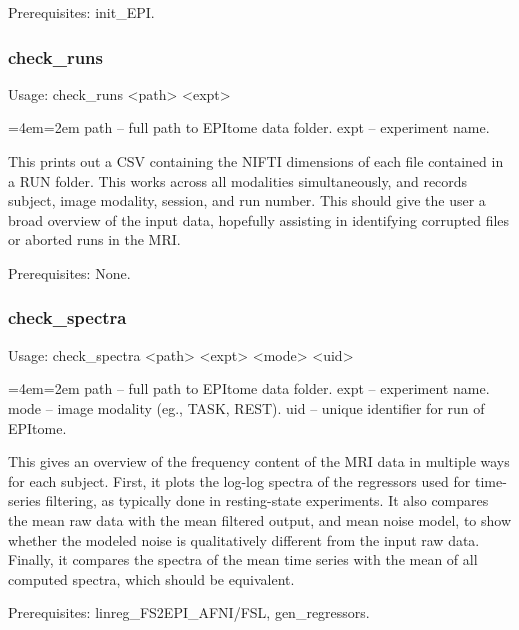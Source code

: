 \documentclass[final,titlepage,letterpaper,oneside,12pt]{article}
\renewcommand{\texttt}[2][BrickRed]{\textcolor{#1}{\ttfamily #2}}%
\newenvironment{blockquote}{%
  \par%
  \medskip
  \leftskip=4em\rightskip=2em%
  \noindent\ignorespaces}{%
  \par\medskip}
\begin{document}
Prerequisites: \texttt{init\_EPI}.

\subsubsection{check\_runs}
Usage: \texttt{check\_runs <path> <expt>}

\begin{blockquote}
path -- full path to EPItome data folder.
expt -- experiment name.
\end{blockquote}

\noindent This prints out a CSV containing the NIFTI dimensions of each file contained in a RUN folder. This works across all modalities simultaneously, and records subject, image modality, session, and run number. This should give the user a broad overview of the input data, hopefully assisting in identifying corrupted files or aborted runs in the MRI.

Prerequisites: None.

\subsubsection{check\_spectra}
Usage: \texttt{check\_spectra <path> <expt> <mode> <uid>}

\begin{blockquote}
path -- full path to EPItome data folder.
expt -- experiment name.
mode -- image modality (eg., TASK, REST).
uid -- unique identifier for run of EPItome.
\end{blockquote}

\noindent This gives an overview of the frequency content of the MRI data in multiple ways for each subject. First, it plots the log-log spectra of the regressors used for time-series filtering, as typically done in resting-state experiments. It also compares the mean raw data with the mean filtered output, and mean noise model, to show whether the modeled noise is qualitatively different from the input raw data. Finally, it compares the spectra of the mean time series with the mean of all computed spectra, which should be equivalent.

Prerequisites: \texttt{linreg\_FS2EPI\_AFNI/FSL, gen\_regressors}.

\end{document}
